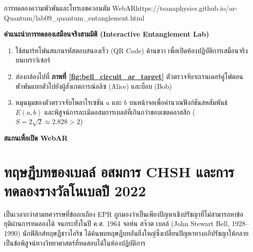 \begin{qrcodelabbox}{การทดลองความพัวพันและโทรเลขควอนตัม WebAR}{https://tsanaphysics.github.io/ar-Quantum/lab09_quantum_entanglement.html}
\begin{minipage}[c]{0.70\textwidth}
\textbf{คำแนะนำการทดลองเสมือนจริงสามมิติ (Interactive Entanglement Lab)}
\begin{enumerate}
    \item ใช้สมาร์ทโฟนสแกนรหัสตอบสนองเร็ว (QR Code) ด้านขวา เพื่อเปิดห้องปฏิบัติการเสมือนจริงบนเบราว์เซอร์
    \item ส่องกล้องไปที่ \textbf{ภาพที่ \ref{fig:bell_circuit_ar_target}} ตัวตรวจจับจะเรนเดอร์คู่โฟตอนพัวพันแยกตัวไปยังผู้สังเกตการณ์อลิซ (Alice) และบ็อบ (Bob)
    \item หมุนมุมของตัวตรวจจับโพลาไรเซชัน $a$ และ $b$ บนหน้าจอเพื่อคำนวณฟังก์ชันสหสัมพันธ์ $E(a, b)$ และพิสูจน์การละเมิดอสมการเบลล์ที่เกินกว่าขอบเขตคลาสสิก ($S = 2\sqrt{2} \approx 2.828 > 2$)
\end{enumerate}
\end{minipage}
\hfill
\begin{minipage}[c]{0.25\textwidth}
\centering
{}
\vspace{4pt}
\scriptsize\textbf{สแกนเพื่อเปิด WebAR}
\end{minipage}
\end{qrcodelabbox}

\section{ทฤษฎีบทของเบลล์ อสมการ CHSH และการทดลองรางวัลโนเบลปี 2022}

เป็นเวลากว่าสามทศวรรษที่ข้อถกเถียง EPR ถูกมองว่าเป็นเพียงปัญหาเชิงปรัชญาที่ไม่สามารถหาข้อยุติผ่านการทดลองได้ จนกระทั่งในปี ค.ศ. 1964 จอห์น สจ๊วต เบลล์ (John Stewart Bell, 1928--1990) นักฟิสิกส์ทฤษฎีชาวไอริช ได้ค้นพบทฤษฎีบทอันยิ่งใหญ่ซึ่งเปลี่ยนปัญหาทางอภิปรัชญาให้กลายเป็นข้อพิสูจน์ทางวิทยาศาสตร์ที่ทดสอบได้ในห้องปฏิบัติการ

